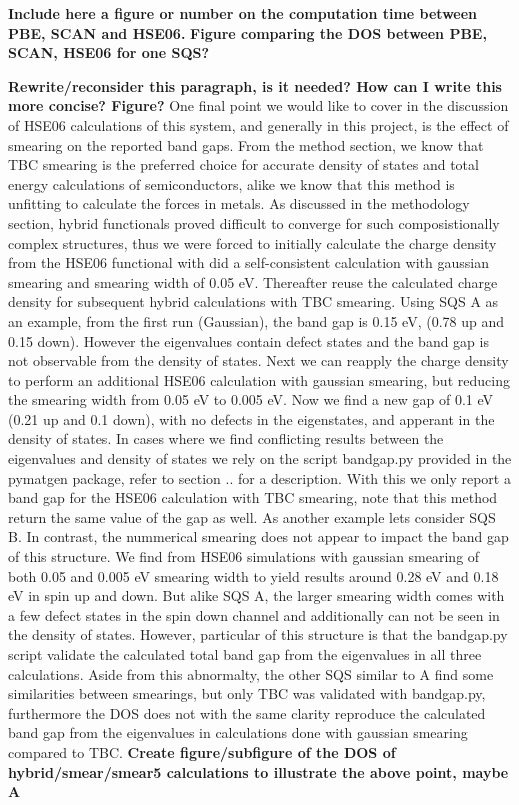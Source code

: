 \textbf{Include here a figure or number on the computation time between PBE, SCAN and HSE06.}
\textbf{Figure comparing the DOS between PBE, SCAN, HSE06 for one SQS?}

\textbf{Rewrite/reconsider this paragraph, is it needed? How can I write this more concise? Figure?}
One final point we would like to cover in the discussion of HSE06 calculations of this system, and generally in this project, is the effect of smearing on the reported band gaps. From the method section, we know that TBC smearing is the preferred choice for accurate density of states and total energy calculations of semiconductors, alike we know that this method is unfitting to calculate the forces in metals. As discussed in the methodology section, hybrid functionals proved difficult to converge for such composistionally complex structures, thus we were forced to initially calculate the charge density from the HSE06 functional with did a self-consistent calculation with gaussian smearing and smearing width of 0.05 eV. Thereafter reuse the calculated charge density for subsequent hybrid calculations with TBC smearing. Using SQS A as an example, from the first run (Gaussian), the band gap is 0.15 eV, (0.78 up and 0.15 down). However the eigenvalues contain defect states and the band gap is not observable from the density of states. Next we can reapply the charge density to perform an additional HSE06 calculation with gaussian smearing, but reducing the smearing width from 0.05 eV to 0.005 eV. Now we find a new gap of 0.1 eV (0.21 up and 0.1 down), with no defects in the eigenstates, and apperant in the density of states. In cases where we find conflicting results between the eigenvalues and density of states we rely on the script bandgap.py provided in the pymatgen package, refer to section .. for a description. With this we only report a band gap for the HSE06 calculation with TBC smearing, note that this method return the same value of the gap as well. As another example lets consider SQS B. In contrast, the nummerical smearing does not appear to impact the band gap of this structure. We find from HSE06 simulations with gaussian smearing of both 0.05 and 0.005 eV smearing width to yield results around 0.28 eV and 0.18 eV in spin up and down. But alike SQS A, the larger smearing width comes with a few defect states in the spin down channel and additionally can not be seen in the density of states. However, particular of this structure is that the bandgap.py script validate the calculated total band gap from the eigenvalues in all three calculations. Aside from this abnormalty, the other SQS similar to A find some similarities between smearings, but only TBC was validated with bandgap.py, furthermore the DOS does not with the same clarity reproduce the calculated band gap from the eigenvalues in calculations done with gaussian smearing compared to TBC. \textbf{Create figure/subfigure of the DOS of hybrid/smear/smear5 calculations to illustrate the above point, maybe A}

